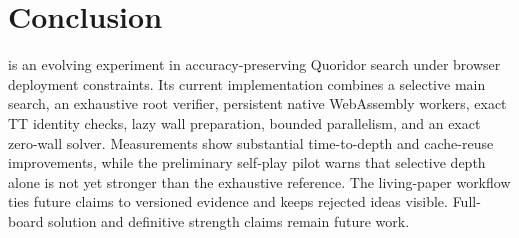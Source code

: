 \section{Conclusion}
\walwuk{} is an evolving experiment in accuracy-preserving Quoridor search under browser deployment constraints. Its current implementation combines a selective main search, an exhaustive root verifier, persistent native WebAssembly workers, exact TT identity checks, lazy wall preparation, bounded parallelism, and an exact zero-wall solver. Measurements show substantial time-to-depth and cache-reuse improvements, while the preliminary self-play pilot warns that selective depth alone is not yet stronger than the exhaustive reference. The living-paper workflow ties future claims to versioned evidence and keeps rejected ideas visible. Full-board solution and definitive strength claims remain future work.
